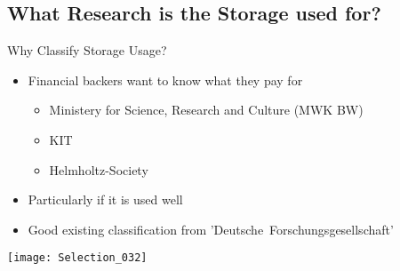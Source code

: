 \subsection{What Research is the Storage used for?}

\begin{frame}[c]{Why Classify Storage Usage?}
    \noindent
    \begin{minipage}[c]{0.6\linewidth}
        \large
        \begin{itemize}[<+(1)->]
            \item Financial backers want to know what they pay for
            \begin{itemize}[<+(1)->]
                \item Ministery for Science, Research and Culture (MWK BW)
                \item KIT
                \item Helmholtz-Society
            \end{itemize}
            \item Particularly if it is used well%
            \item Good existing classification from 'Deutsche~Forschungsgesellschaft'
        \end{itemize}
    \end{minipage} %
    \begin{minipage}[c]{0.3\linewidth}
        \pause
    \texttt{[image: Selection\_032]} \\
    \end{minipage}
\end{frame}

